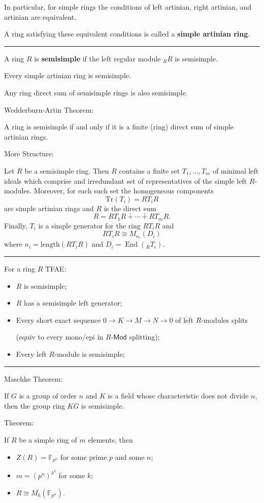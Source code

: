 \documentclass[12pt]{article}
\newcommand{\keyword}[1]{\textbf{#1}}
\newcommand{\sepline}{\rule{\textwidth}{0.4pt}}
\theoremstyle{definition}
\newcommand{\F}{\mathbb{F}}
\newcommand{\<}{\left\langle}
\renewcommand{\>}{\right\rangle}
\newcommand{\iso}{\cong}
\DeclareMathOperator{\End}{End}
\renewcommand{\_}[1]{{_{#1}}}
\begin{document}
In particular, for simple rings the conditions of left artinian, right artinian, and artinian are equivalent.

A ring satisfying these equivalent conditions is called a \keyword{simple artinian ring}.

\sepline

A ring $R$ is \keyword{semisimple} if the left regular module $\_RR$ is semisimple.

Every simple artinian ring is semisimple.

Any ring direct sum of semisimple rings is also semisimple.

Wedderburn-Artin Theorem:

A ring is semisimple if and only if it is a finite (ring) direct sum of simple artinian rings.

More Structure:

Let $R$ be a semisimple ring.
Then $R$ contains a finite set $T_1, \dots, T_m$ of minimal left ideals which comprise and irredundant set of representatives of the simple left $R$-modules.
Moreover, for each such set the homogeneous components
\[
    \mathrm{Tr}(T_i) = RT_iR
\]
are simple artinian rings and $R$ is the direct sum
\[
    R = RT_1R \dotplus \cdots \dotplus RT_mR.
\]
Finally, $T_i$ is a simple generator for the ring $RT_iR$ and
\[
    RT_iR \iso M_{n_i}(D_i)
\]
where $n_i = \mathrm{length}(RT_iR)$ and $D_i = \End(\_RT_i)$.

\sepline

For a ring $R$ TFAE:
\begin{itemize}[nosep]
    \item $R$ is semisimple;
    \item $R$ has a semisimple left generator;
    \item Every short exact sequence $0 \to K \to M \to N \to 0$ of left $R$-modules splits
    
    (equiv to every mono/epi in $R\text{-}\mathsf{Mod}$ splitting);

    \item Every left $R$-module is semisimple;
\end{itemize}

\sepline

Maschke Theorem:

If $G$ is a group of order $n$ and $K$ is a field whose characteristic does not divide $n$, then the group ring $KG$ is semisimple.

Theorem:

If $R$ be a simple ring of $m$ elements, then
\begin{itemize}
    \item $Z(R) = \F_{p^n}$ for some prime $p$ and some $n$;
    \item $m = (p^n)^{k^2}$ for some $k$;
    \item $R \iso M_k(\F_{p^n})$.
\end{itemize}
\end{document}
